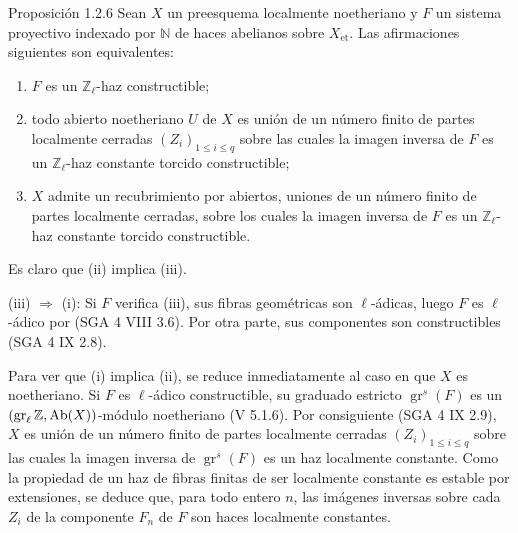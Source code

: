 \begin{statement}{Proposición 1.2.6}
Sean \(X\) un preesquema localmente noetheriano y \(F\) un sistema proyectivo indexado por \(\mathbb N\) de haces abelianos sobre \(X_{\mathrm{\acute et}}\). Las afirmaciones siguientes son equivalentes:
\begin{enumerate}[label=(\roman*)]
\item \(F\) es un \(\mathbb Z_\ell\)-haz constructible;
\item todo abierto noetheriano \(U\) de \(X\) es unión de un número finito de partes localmente cerradas \((Z_i)_{1\le i\le q}\) sobre las cuales la imagen inversa de \(F\) es un \(\mathbb Z_\ell\)-haz constante torcido constructible;
\item \(X\) admite un recubrimiento por abiertos, uniones de un número finito de partes localmente cerradas, sobre los cuales la imagen inversa de \(F\) es un \(\mathbb Z_\ell\)-haz constante torcido constructible.
\end{enumerate}
\end{statement}

\begin{prooftext}[Demostración]
Es claro que (ii) implica (iii).

(iii) \(\Longrightarrow\) (i): Si \(F\) verifica (iii), sus fibras geométricas son \(\ell\)-ádicas, luego \(F\) es \(\ell\)-ádico por (SGA 4 VIII 3.6). Por otra parte, sus componentes son constructibles (SGA 4 IX 2.8).

Para ver que (i) implica (ii), se reduce inmediatamente al caso en que \(X\) es noetheriano. Si \(F\) es \(\ell\)-ádico constructible, su graduado estricto \(\operatorname{gr}^s(F)\) es un \((\operatorname{gr}_\ell\mathbb Z,\operatorname{Ab}(X))\)-módulo noetheriano (V 5.1.6). Por consiguiente (SGA 4 IX 2.9), \(X\) es unión de un número finito de partes localmente cerradas \((Z_i)_{1\le i\le q}\) sobre las cuales la imagen inversa de \(\operatorname{gr}^s(F)\) es un haz localmente constante. Como la propiedad de un haz de fibras finitas de ser localmente constante es estable por extensiones, se deduce que, para todo entero \(n\), las imágenes inversas sobre cada \(Z_i\) de la componente \(F_n\) de \(F\) son haces localmente constantes.
\end{prooftext}
